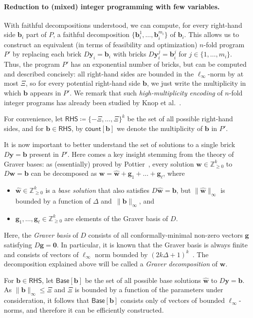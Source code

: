 \documentclass{article}
\renewcommand{\leq}{\leqslant}
\renewcommand{\geq}{\geqslant}
\newcommand{\Z}{\mathbb{Z}}
\newcommand{\Zn}{\Z_{\geq 0}}
\newcommand{\tup}[1]{{\mathbf{#1}}}
\newcommand{\ww}{\tup w}
\newcommand{\whww}{{\widehat{\ww}}}
\newcommand{\yy}{\tup y}
\newcommand{\bb}{\tup b}
\renewcommand{\gg}{\tup g}
\newcommand{\RHS}{\mathsf{RHS}}
\newcommand{\Base}{\mathsf{Base}}
\newcommand{\cntTypes}{\mathsf{count}}
\begin{document}
\paragraph*{Reduction to (mixed) integer programming with few variables.} With faithful decompositions understood, we can compute, for every right-hand side $\bb_i$ part of $P$, a faithful decomposition $\{\bb^1_i,\ldots,\bb_i^{m_i}\}$ of $\bb_i$. This allows us to construct an equivalent (in terms of feasibility and optimization) $n$-fold program~$P'$ by replacing each brick $D\yy_i=\bb_i$ with bricks $D\yy_i^j=\bb_i^j$ for $j\in \{1,\ldots,m_i\}$. Thus, the program $P'$ has an exponential number of bricks, but can be computed and described concisely: all right-hand sides are bounded in the $\ell_\infty$-norm by at most $\Xi$, so for every potential right-hand side $\bb$, we just write the multiplicity in which $\bb$ appears in $P'$. We remark that such {\em{high-multiplicity encoding}} of $n$-fold integer programs has already been studied by Knop et al.~\cite{KnopKLMO23}.

For convenience, let $\RHS\coloneqq \{-\Xi,\ldots,\Xi\}^k$ be the set of all possible right-hand sides, and for $\bb\in \RHS$, by $\cntTypes[\bb]$ we denote the multiplicity of $\bb$ in $P'$.

It is now important to better understand the set of solutions to a single brick $D\yy=\bb$ present in $P'$. Here comes a key insight stemming from the theory of Graver bases: as (essentially) proved by Pottier~\cite{Pottier91}, every solution $\ww\in \Zn^k$ to $D\ww=\bb$ can be decomposed as $\ww=\whww+\gg_1+\ldots+\gg_\ell$, where
\begin{itemize}[nosep]
\item $\whww\in \Zn^k$ is a {\em{base solution}} that also satisfies $D\whww=\bb$, but $\|\whww\|_\infty$ is bounded by a function of $\Delta$ and~$\|\bb\|_\infty$, and
\item $\gg_1,\ldots,\gg_\ell\in \Zn^k$ are elements of the Graver basis of $D$.
\end{itemize}
Here, the {\em{Graver basis}} of $D$ consists of all conformally-minimal non-zero vectors $\gg$ satisfying $D\gg=\mathbf{0}$. In particular, it is known that the Graver basis is always finite and consists of vectors of $\ell_\infty$ norm bounded by $(2k\Delta+1)^k$~\cite{EisenbrandHK18}. The decomposition explained above will be called a {\em{Graver decomposition}} of $\ww$.

For $\bb\in \RHS$, let $\Base[\bb]$ be the set of all possible base solutions $\whww$ to $D\yy=\bb$. As $\|\bb\|_\infty\leq \Xi$ and $\Xi$ is bounded by a function of the parameters under consideration, it follows that $\Base[\bb]$ consists only of vectors of bounded $\ell_\infty$-norms, and therefore it can be efficiently constructed.
\end{document}
